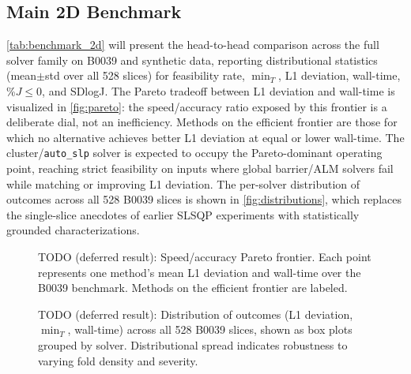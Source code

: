 \documentclass[lettersize,journal]{IEEEtran}
\begin{document}
\subsection{Main 2D Benchmark}
\label{sec:benchmark_2d}

\autoref{tab:benchmark_2d} will present the head-to-head comparison across the full solver family on B0039 and synthetic data, reporting distributional statistics (mean$\pm$std over all 528 slices) for feasibility rate, $\min_T$, L1 deviation, wall-time, \%$J{\leq}0$, and SDlogJ. The Pareto tradeoff between L1 deviation and wall-time is visualized in \autoref{fig:pareto}: the speed/accuracy ratio exposed by this frontier is a deliberate dial, not an inefficiency. Methods on the efficient frontier are those for which no alternative achieves better L1 deviation at equal or lower wall-time. The cluster/\texttt{auto\_slp} solver is expected to occupy the Pareto-dominant operating point, reaching strict feasibility on inputs where global barrier/ALM solvers fail while matching or improving L1 deviation. The per-solver distribution of outcomes across all 528 B0039 slices is shown in \autoref{fig:distributions}, which replaces the single-slice anecdotes of earlier SLSQP experiments with statistically grounded characterizations.

\begin{table}[ht]\centering
\caption{TODO (deferred result): Main 2D benchmark. All methods evaluated on B0039 (528 slices) and the synthetic suite. Columns: geometric feasibility rate, minimum signed area ($\min_T$), L1 deviation, wall-time, \%$J{\leq}0$, and SDlogJ. Statistics are mean$\pm$std over all slices.}
\label{tab:benchmark_2d}
\end{table}

\begin{figure}[ht]\centering
\caption{TODO (deferred result): Speed/accuracy Pareto frontier. Each point represents one method's mean L1 deviation and wall-time over the B0039 benchmark. Methods on the efficient frontier are labeled.}
\label{fig:pareto}
\end{figure}

\begin{figure}[ht]\centering
\caption{TODO (deferred result): Distribution of outcomes (L1 deviation, $\min_T$, wall-time) across all 528 B0039 slices, shown as box plots grouped by solver. Distributional spread indicates robustness to varying fold density and severity.}
\label{fig:distributions}
\end{figure}
\end{document}

